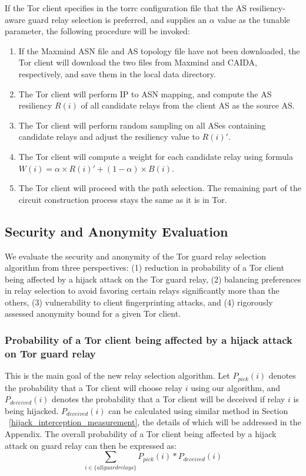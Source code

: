 If the Tor client specifies in the torrc configuration file that the AS resiliency-aware guard relay selection is preferred, and supplies an $\alpha$ value as the tunable parameter, the following procedure will be invoked:

\begin{enumerate}
\item If the Maxmind ASN file and AS topology file have not been downloaded, the Tor client will download the two files from Maxmind and CAIDA, respectively, and save them in the local data directory. 
\item The Tor client will perform IP to ASN mapping, and compute the AS resiliency $R(i)$ of all candidate relays from the client AS as the source AS. 
\item The Tor client will perform random sampling on all ASes containing candidate relays and adjust the resiliency value to $R(i)\prime$.
\item The Tor client will compute a weight for each candidate relay using formula $W(i) = \alpha \times R(i) \prime + (1 - \alpha) \times B(i)$. 
\item The Tor client will proceed with the path selection. The remaining part of the circuit construction process stays the same as it is in Tor. 
\end{enumerate}

\subsection{Security and Anonymity Evaluation}
We evaluate the security and anonymity of the Tor guard relay selection algorithm from three perspectives: (1) reduction in probability of a Tor client being affected by a hijack attack on the Tor guard relay, (2) balancing preferences in relay selection to avoid favoring certain relays significantly more than the others, (3) vulnerability to client fingerprinting attacks, and (4) rigorously assessed anonymity bound for a given Tor client. 

\subsubsection{Probability of a Tor client being affected by a hijack attack on Tor guard relay}
\label{attack_probability}
This is the main goal of the new relay selection algorithm. Let $P_{pick}(i)$ denotes the probability that a Tor client will choose relay $i$ using our algorithm, and $P_{deceived}(i)$ denotes the probability that a Tor client will be deceived if relay $i$ is being hijacked. $P_{deceived}(i)$ can be calculated using similar method in Section ~\ref{hijack_interception_measurement}, the details of which will be addressed in the Appendix.  The overall probability of a Tor client being affected by a hijack attack on guard relay can then be expressed as:
\begin{equation*}
\sum_{i \in \{all guard relays\}} P_{pick}(i) * P_{deceived}(i)
\end{equation*}

